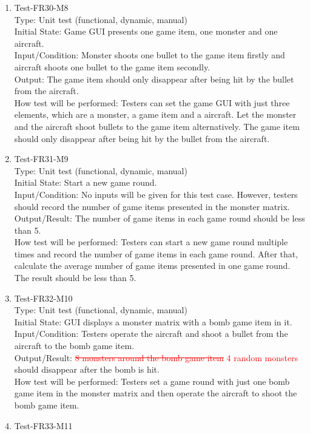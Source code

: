 \documentclass[12pt]{article}
\begin{document}
\begin{enumerate}[1.]
\item Test-FR30-M8\\
Type: Unit test (functional, dynamic, manual)\\
Initial State: Game GUI presents one game item, one 
monster and one aircraft.\\
Input/Condition: Monster shoots one bullet to the game
item firstly and aircraft shoots one bullet to the game item 
secondly.\\
Output: The game item should only disappear after being 
hit by the bullet from the aircraft.\\
How test will be performed: Testers can set the game GUI
with just three elements, which are a monster, a game 
item and a aircraft. Let the monster and the aircraft 
shoot bullets to the game item alternatively. The 
game item should only disappear after being hit by the bullet 
from the aircraft.
\newpage
\item Test-FR31-M9\\ 
Type: Unit test (functional, dynamic, manual)\\
Initial State: Start a new game round.\\
Input/Condition: No inputs will be given 
for this test case. However, testers should record the
number of game items presented in the monster matrix.\\
Output/Result: The number of game items in each game round
should be less than 5.\\
How test will be performed: Testers can start a new game
round multiple times and record the number of game items
in each game round. After that, calculate the average
number of game items presented in one game round. The
result should be less than 5.
\item Test-FR32-M10\\
Type: Unit test (functional, dynamic, manual)\\
Initial State: GUI displays a monster matrix with a bomb
game item in it.\\
Input/Condition: Testers operate the aircraft and shoot a bullet
from the aircraft to the bomb game item.\\
Output/Result: \textcolor{red}{\st{8 monsters around the bomb game item} 4 random
monsters}
should disappear 
after the bomb is hit.\\
How test will be performed: Testers set a game round
with just one bomb game item in the monster matrix and then operate
the aircraft to shoot the bomb game item.
\item Test-FR33-M11\\

\end{enumerate}
\end{document}

